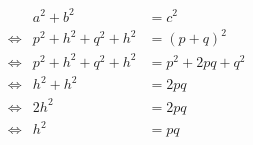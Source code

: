\begin{Beweis}
  \begin{center}
    \begin{align*}
      && a^2+b^2 &= c^2\\
      & \Leftrightarrow& p^2+h^2+q^2+h^2 &= (p+q)^2\\
      & \Leftrightarrow& p^2+h^2+q^2+h^2 &= p^2+2pq+q^2\\
      & \Leftrightarrow& h^2+h^2 &= 2pq\\
      & \Leftrightarrow& 2h^2 &= 2pq\\
      & \Leftrightarrow& h^2 &= pq\\
    \end{align*}
  \end{center}
\end{Beweis}

